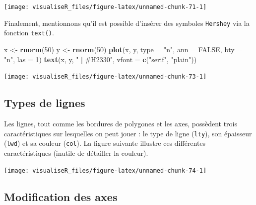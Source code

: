 \documentclass[]{article}
\newenvironment{Shaded}{\begin{snugshade}}{\end{snugshade}}
\newcommand{\DataTypeTok}[1]{\textcolor[rgb]{0.13,0.29,0.53}{#1}}
\newcommand{\DecValTok}[1]{\textcolor[rgb]{0.00,0.00,0.81}{#1}}
\newcommand{\KeywordTok}[1]{\textcolor[rgb]{0.13,0.29,0.53}{\textbf{#1}}}
\newcommand{\NormalTok}[1]{#1}
\newcommand{\OtherTok}[1]{\textcolor[rgb]{0.56,0.35,0.01}{#1}}
\newcommand{\StringTok}[1]{\textcolor[rgb]{0.31,0.60,0.02}{#1}}
\begin{document}
\begin{center}\texttt{[image: visualiseR\_files/figure-latex/unnamed-chunk-71-1]} \end{center}

Finalement, mentionnons qu'il est possible d'insérer des symboles \texttt{Hershey} via la fonction \texttt{text()}.

\begin{Shaded}
\begin{Highlighting}[]
\NormalTok{x <-}\StringTok{ }\KeywordTok{rnorm}\NormalTok{(}\DecValTok{50}\NormalTok{)}
\NormalTok{y <-}\StringTok{ }\KeywordTok{rnorm}\NormalTok{(}\DecValTok{50}\NormalTok{)}
\KeywordTok{plot}\NormalTok{(x, y, }\DataTypeTok{type =} \StringTok{"n"}\NormalTok{, }\DataTypeTok{ann =} \OtherTok{FALSE}\NormalTok{, }\DataTypeTok{bty =} \StringTok{"n"}\NormalTok{, }\DataTypeTok{las =} \DecValTok{1}\NormalTok{)}
\KeywordTok{text}\NormalTok{(x, y, }\StringTok{" | #H2330"}\NormalTok{, }\DataTypeTok{vfont =} \KeywordTok{c}\NormalTok{(}\StringTok{"serif"}\NormalTok{, }\StringTok{"plain"}\NormalTok{))}
\end{Highlighting}
\end{Shaded}

\begin{center}\texttt{[image: visualiseR\_files/figure-latex/unnamed-chunk-73-1]} \end{center}

\hypertarget{types-de-lignes}{%
\subsection{Types de lignes}\label{types-de-lignes}}

Les lignes, tout comme les bordures de polygones et les axes, possèdent trois caractéristiques sur lesquelles on peut jouer : le type de ligne (\texttt{lty}), son épaisseur (\texttt{lwd}) et sa couleur (\texttt{col}). La figure suivante illustre ces différentes caractéristiques (inutile de détailler la couleur).

\begin{center}\texttt{[image: visualiseR\_files/figure-latex/unnamed-chunk-74-1]} \end{center}

\hypertarget{modification-des-axes}{%
\subsection{Modification des axes}\label{modification-des-axes}}
\end{document}
